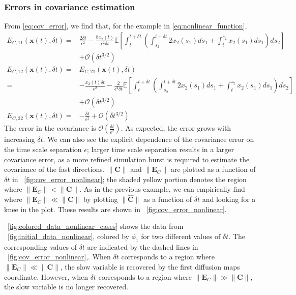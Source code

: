 \subsubsection{Errors in covariance estimation}

From \eqref{eq:cov_error}, we find that, for the example in \eqref{eq:nonlinear_function},
%
\begin{equation}
\begin{aligned}
E_{C,11} (\mathbf{x}(t), \delta t)
=&
\frac{2 \delta t}{\epsilon^2}
- \frac{8 x_2(t)}{\epsilon^2 \delta t} \mathbb{E} \left[ \int_t^{t+\delta t} \left( \int_{s_2}^{t+\delta t} 2 x_2(s_1) ds_1
+  \int_t^{s_2} x_2(s_1) ds_1 \right) ds_2\right]  \\ &+ \mathcal{O} (\delta t^{3/2}) \\
E_{C, 12} (\mathbf{x}(t), \delta t)
= &
E_{C, 21} (\mathbf{x}(t), \delta t)\\
=&
- \frac{x_2(t) \delta t}{\epsilon^2}
- \frac{2}{\epsilon^2 \delta t} \mathbb{E} \left[ \int_t^{t+\delta t} \left( \int_{s_2}^{t + \delta t} 2 x_2(s_1) ds_1 + \int_t^{s_2} x_2(s_1) ds_1 \right) ds_2 \right] \\ &+ \mathcal{O} (\delta t^{3/2})\\
E_{C, 22} (\mathbf{x}(t), \delta t)
=&
-\frac{\delta t}{\epsilon^2} + \mathcal{O} (\delta t^{3/2})
\end{aligned}
\end{equation}
%
The error in the covariance is $\mathcal{O} \left( \frac{\delta t}{\epsilon^2} \right)$.
%
As expected, the error grows with increasing $\delta t$.
%
We can also see the explicit dependence of the covariance error on the time scale separation $\epsilon$; larger time scale separation results in a larger covariance error, as a more refined simulation burst is required to estimate the covariance of the fast directions.
%
$\|\mathbf{C} \|$ and $\| \mathbf{E}_C\|  $ are plotted as a function of $\delta t$ in \fig~\ref{fig:cov_error_nonlinear}; the shaded yellow portion denotes the region where $\| \mathbf{E}_C \| < \| \mathbf{C} \|$.
%
As in the previous example, we can empirically find where $\| \mathbf{E}_C \| \ll \| \mathbf{C} \|$  by plotting $\| \hat{\mathbf{C}} \|$ as a function of $\delta t $ and looking for a knee in the plot.
%
These results are shown in \fig~\ref{fig:cov_error_nonlinear}.

\fig~\ref{fig:colored_data_nonlinear_cases} shows the data from \fig~\ref{fig:initial_data_nonlinear}, colored by $\phi_1$ for two different values of $\delta t$.
%
The corresponding values of $\delta t$ are indicated by the dashed lines in \fig~\ref{fig:cov_error_nonlinear},.
%
When $\delta t$ corresponds to a region where $\|\mathbf{E}_C \| \ll \| \mathbf{C} \|$, the slow variable is recovered by the first diffusion maps coordinate.
%
However, when $\delta t$ corresponds to a region where $\|\mathbf{E}_C \| \gg \| \mathbf{C} \|$, the slow variable is no longer recovered.


